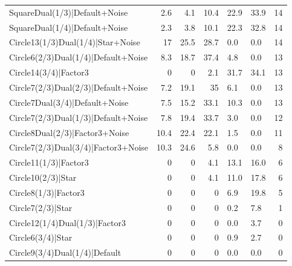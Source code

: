 \begin{tabular}{lrrrllr}
 SquareDual(1/3)|Default+Noise        &             2.6 &            4.1 &            10.4 & 22.9            & 33.9            &           14 \\
 SquareDual(1/4)|Default+Noise        &             2.3 &            3.8 &            10.1 & 22.3            & 32.8            &           14 \\
 Circle13(1/3)Dual(1/4)|Star+Noise    &            17   &           25.5 &            28.7 & 0.0             & 0.0             &           14 \\
 Circle6(2/3)Dual(1/4)|Default+Noise  &             8.3 &           18.7 &            37.4 & 4.8             & 0.0             &           13 \\
 Circle14(3/4)|Factor3                &             0   &            0   &             2.1 & 31.7            & 34.1            &           13 \\
 Circle7(2/3)Dual(2/3)|Default+Noise  &             7.2 &           19.1 &            35   & 6.1             & 0.0             &           13 \\
 Circle7Dual(3/4)|Default+Noise       &             7.5 &           15.2 &            33.1 & 10.3            & 0.0             &           13 \\
 Circle7(2/3)Dual(1/3)|Default+Noise  &             7.8 &           19.4 &            33.7 & 3.0             & 0.0             &           12 \\
 Circle8Dual(2/3)|Factor3+Noise       &            10.4 &           22.4 &            22.1 & 1.5             & 0.0             &           11 \\
 Circle7(2/3)Dual(3/4)|Factor3+Noise  &            10.3 &           24.6 &             5.8 & 0.0             & 0.0             &            8 \\
 Circle11(1/3)|Factor3                &             0   &            0   &             4.1 & 13.1            & 16.0            &            6 \\
 Circle10(2/3)|Star                   &             0   &            0   &             4.1 & 11.0            & 17.8            &            6 \\
 Circle8(1/3)|Factor3                 &             0   &            0   &             0   & 6.9             & 19.8            &            5 \\
 Circle7(2/3)|Star                    &             0   &            0   &             0   & 0.2             & 7.8             &            1 \\
 Circle12(1/4)Dual(1/3)|Factor3       &             0   &            0   &             0   & 0.0             & 3.7             &            0 \\
 Circle6(3/4)|Star                    &             0   &            0   &             0   & 0.9             & 2.7             &            0 \\
 Circle9(3/4)Dual(1/4)|Default        &             0   &            0   &             0   & 0.0             & 0.0             &            0 \\
\hline
\end{tabular}